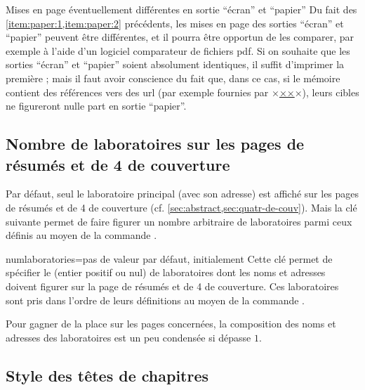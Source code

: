 \begin{dbwarning}{Mises en page éventuellement différentes en sortie
    \enquote{écran} et \enquote{papier}}{}
  Du fait des \cref{item:paper:1,item:paper:2} précédents, les mises en page
  des sorties \enquote{écran} et \enquote{papier} peuvent être différentes, et
  il pourra être opportun de les comparer, par exemple à l'aide d'un logiciel
  comparateur de fichiers \gls{pdf}. Si on souhaite que les sorties
  \enquote{écran} et \enquote{papier} soient absolument identiques, il suffit
  d'imprimer la première ; mais il faut avoir conscience du fait que, dans ce
  cas, si le mémoire contient des références vers des \acrshort{url} (par
  exemple fournies par ×\href{×\meta{\acrshort*{url}}×}{××}×),
  leurs cibles ne figureront nulle part en sortie \enquote{papier}.
\end{dbwarning}

\subsection{Nombre de laboratoires sur les pages de résumés et de 4\ieme{} de couverture}
\label{sec:nombre-de-labor}

Par défaut, seul le laboratoire principal (avec son adresse) est affiché sur
les pages de résumés et de 4\ieme{} de couverture
(cf. \vref{sec:abstract,sec:quatr-de-couv}). Mais la clé
 suivante permet de faire figurer un nombre arbitraire
de laboratoires parmi ceux définis au moyen de la commande
.%

\begin{docKey}{numlaboratories}{=}{pas de valeur par
    défaut, initialement }
  Cette clé permet de spécifier le  (entier positif ou nul) de
  laboratoires dont les noms et adresses doivent figurer sur la page de résumés
  et de 4\ieme{} de couverture. Ces laboratoires sont pris dans l'ordre de
  leurs définitions au moyen de la commande .
\end{docKey}

Pour gagner de la place sur les pages concernées, la composition des noms et
adresses des laboratoires est un peu condensée si  dépasse $1$.

\subsection{Style des têtes de chapitres}\label{sec:style-des-tetes}

